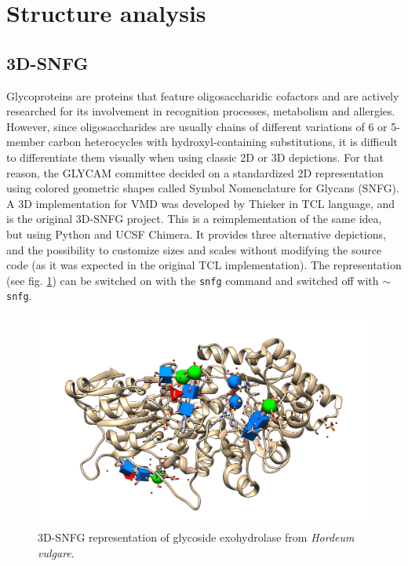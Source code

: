 \section{Structure analysis}

\subsection{3D-SNFG}
Glycoproteins are proteins that feature oligosaccharidic cofactors and are actively researched for its involvement in recognition processes, metabolism and allergies. However, since oligosaccharides are usually chains of different variations of 6 or 5-member carbon heterocycles with hydroxyl-containing substitutions, it is difficult to differentiate them visually when using classic 2D or 3D depictions. For that reason, the GLYCAM committee decided on a standardized 2D representation using colored geometric shapes called Symbol Nomenclature for Glycans (SNFG).\cite{snfg} A 3D implementation for VMD was developed by Thieker\cite{3dsnfg} in TCL language, and is the original 3D-SNFG project. This is a reimplementation of the same idea, but using Python and UCSF Chimera. It provides three alternative depictions, and the possibility to customize sizes and scales without modifying the source code (as it was expected in the original TCL implementation). The representation (see fig. \ref{fig:tangram-snfg}) can be switched on with the \texttt{snfg} command and switched off with \texttt{$ \sim $ snfg}.

\begin{figure}[t]
	\begin{Center}
		\includegraphics[width=\textwidth]{./figures/05/tangram_snfg.png}
	\end{Center}
	\cprotect\caption[Tangram 3D-SNFG]{3D-SNFG representation of glycoside exohydrolase from \textit{Hordeum vulgare}.\cite{3wlh}}
	\label{fig:tangram-snfg}
\end{figure}

